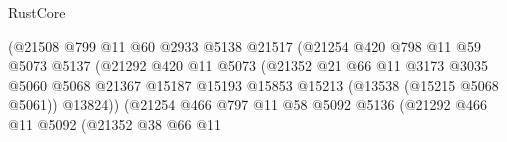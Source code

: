 \begin{lexlean}{RustCore}
\begin{coremodule}
                                          (@21508
                                            @799
                                            @11
                                            @60
                                            @2933
                                            @5138
                                            @21517
                                            (@21254
                                              @420
                                              @798
                                              @11
                                              @59
                                              @5073
                                              @5137
                                              (@21292
                                                @420
                                                @11
                                                @5073
                                                (@21352
                                                  @21
                                                  @66
                                                  @11
                                                  @3173
                                                  @3035
                                                  @5060
                                                  @5068
                                                  @21367
                                                  @15187
                                                  @15193
                                                  @15853
                                                  @15213
                                                  (@13538 (@15215 @5068 @5061))
                                                  @13824))
                                              (@21254
                                                @466
                                                @797
                                                @11
                                                @58
                                                @5092
                                                @5136
                                                (@21292
                                                  @466
                                                  @11
                                                  @5092
                                                  (@21352
                                                    @38
                                                    @66
                                                    @11

\end{coremodule}
\end{lexlean}
